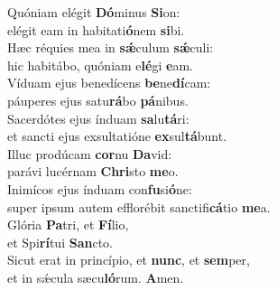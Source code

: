 \evenverse Quóniam elégit \textbf{Dó}minus \textbf{Si}on:~\*\\
\evenverse elégit eam in habitati\textbf{ó}nem \textbf{si}bi.\\
\oddverse Hæc réquies mea in \textbf{sǽ}culum \textbf{sǽ}culi:~\*\\
\oddverse hic habitábo, quóniam e\textbf{lé}gi \textbf{e}am.\\
\evenverse Víduam ejus benedícens \textbf{be}ne\textbf{dí}cam:~\*\\
\evenverse páuperes ejus satu\textbf{rá}bo \textbf{pá}nibus.\\
\oddverse Sacerdótes ejus índuam \textbf{sa}lu\textbf{tá}ri:~\*\\
\oddverse et sancti ejus exsultatióne \textbf{ex}sul\textbf{tá}bunt.\\
\evenverse Illuc prodúcam \textbf{cor}nu \textbf{Da}vid:~\*\\
\evenverse parávi lucérnam \textbf{Chri}sto \textbf{me}o.\\
\oddverse Inimícos ejus índuam con\textbf{fu}si\textbf{ó}ne:~\*\\
\oddverse super ipsum autem efflorébit sanctifi\textbf{cá}tio \textbf{me}a.\\
\evenverse Glória \textbf{Pa}tri, et \textbf{Fí}lio,~\*\\
\evenverse et Spi\textbf{rí}tui \textbf{San}cto.\\
\oddverse Sicut erat in princípio, et \textbf{nunc}, et \textbf{sem}per,~\*\\
\oddverse et in sǽcula sæcu\textbf{ló}rum. \textbf{A}men.\\
